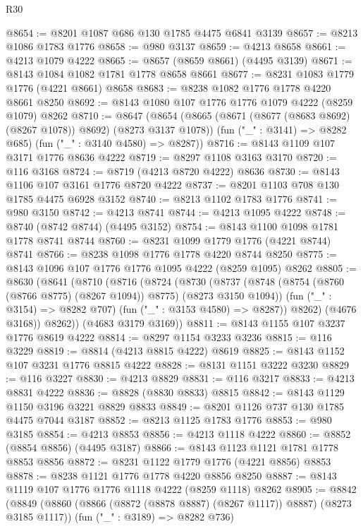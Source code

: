\begin{lexlean}{R30}
\begin{coremodule}
{{{{{@8654 := @8201 @1087 @686 @130 @1785 @4475 @6841 @3139
@8657 := @8213 @1086 @1783 @1776
@8658 := @980 @3137
@8659 := @4213 @8658
@8661 := @4213 @1079 @4222
@8665 := @8657 (@8659 @8661) (@4495 @3139)
@8671 := @8143 @1084 @1082 @1781 @1778 @8658 @8661
@8677 := @8231 @1083 @1779 @1776 (@4221 @8661) @8658
@8683 := @8238 @1082 @1776 @1778 @4220 @8661 @8250
@8692 := @8143 @1080 @107 @1776 @1776 @1079 @4222 (@8259 @1079) @8262
@8710 := @8647
    (@8654
      (@8665 (@8671 (@8677 (@8683 @8692) (@8267 @1078)) @8692) (@8273 @3137 @1078))
      (fun ("_" : @3141) => @8282 @685)
      (fun ("_" : @3140 @4580) => @8287))
@8716 := @8143 @1109 @107 @3171 @1776 @8636 @4222
@8719 := @8297 @1108 @3163 @3170
@8720 := @116 @3168
@8724 := @8719 (@4213 @8720 @4222) @8636
@8730 := @8143 @1106 @107 @3161 @1776 @8720 @4222
@8737 := @8201 @1103 @708 @130 @1785 @4475 @6928 @3152
@8740 := @8213 @1102 @1783 @1776
@8741 := @980 @3150
@8742 := @4213 @8741
@8744 := @4213 @1095 @4222
@8748 := @8740 (@8742 @8744) (@4495 @3152)
@8754 := @8143 @1100 @1098 @1781 @1778 @8741 @8744
@8760 := @8231 @1099 @1779 @1776 (@4221 @8744) @8741
@8766 := @8238 @1098 @1776 @1778 @4220 @8744 @8250
@8775 := @8143 @1096 @107 @1776 @1776 @1095 @4222 (@8259 @1095) @8262
@8805 := @8630
    (@8641
      (@8710
        (@8716
          (@8724
            (@8730
              (@8737
                (@8748 (@8754 (@8760 (@8766 @8775) (@8267 @1094)) @8775) (@8273 @3150 @1094))
                (fun ("_" : @3154) => @8282 @707)
                (fun ("_" : @3153 @4580) => @8287))
              @8262)
            (@4676 @3168))
          @8262))
      (@4683 @3179 @3169))
@8811 := @8143 @1155 @107 @3237 @1776 @8619 @4222
@8814 := @8297 @1154 @3233 @3236
@8815 := @116 @3229
@8819 := @8814 (@4213 @8815 @4222) @8619
@8825 := @8143 @1152 @107 @3231 @1776 @8815 @4222
@8828 := @8131 @1151 @3222 @3230
@8829 := @116 @3227
@8830 := @4213 @8829
@8831 := @116 @3217
@8833 := @4213 @8831 @4222
@8836 := @8828 (@8830 @8833) @8815
@8842 := @8143 @1129 @1150 @3196 @3221 @8829 @8833
@8849 := @8201 @1126 @737 @130 @1785 @4475 @7044 @3187
@8852 := @8213 @1125 @1783 @1776
@8853 := @980 @3185
@8854 := @4213 @8853
@8856 := @4213 @1118 @4222
@8860 := @8852 (@8854 @8856) (@4495 @3187)
@8866 := @8143 @1123 @1121 @1781 @1778 @8853 @8856
@8872 := @8231 @1122 @1779 @1776 (@4221 @8856) @8853
@8878 := @8238 @1121 @1776 @1778 @4220 @8856 @8250
@8887 := @8143 @1119 @107 @1776 @1776 @1118 @4222 (@8259 @1118) @8262
@8905 := @8842
    (@8849
      (@8860 (@8866 (@8872 (@8878 @8887) (@8267 @1117)) @8887) (@8273 @3185 @1117))
      (fun ("_" : @3189) => @8282 @736)
}}}}}
\end{coremodule}
\end{lexlean}
